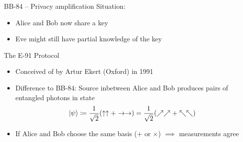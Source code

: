 \documentclass{beamer}
\begin{document}
	\begin{frame}{BB-84 – Privacy amplification}
		Situation:
		\begin{itemize}
			\item Alice and Bob now share a key
			\item Eve might still have partial knowledge of the key
		\end{itemize}

	\end{frame}

	\begin{frame}{The E-91 Protocol} %
		\begin{itemize}
			\item Conceived of by Artur Ekert (Oxford) in 1991
			\item Difference to BB-84: Source inbetween Alice and Bob
			produces pairs of entangled photons in state
				\begin{align*}
					\ket{\psi} \coloneqq \frac{1}{\sqrt{2}}(\uparrow \uparrow + \rightarrow
					\rightarrow) = \frac{1}{\sqrt{2}}(\nearrow \nearrow +
					\nwarrow \nwarrow)
				\end{align*}
			\item If Alice and Bob choose the same basis ($+$ or $\times$) $\implies$
			measurements agree
		\end{itemize}
	\end{frame}
\end{document}
